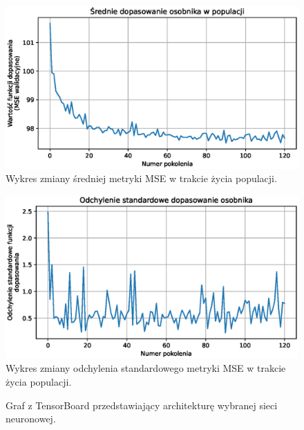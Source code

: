 \documentclass[a4paper,12pt]{article}
\numberwithin{figure}{section}
\begin{document}
    \begin{figure}[H]
        \centering
        \includegraphics[width=\textwidth]{g_a_average_fitness}
        \caption{Wykres zmiany średniej metryki MSE w trakcie życia populacji.}
        \label{fig:g_a_average_fitness}
    \end{figure}

    \smallskip

    \begin{figure}[H]
        \centering
        \includegraphics[width=\textwidth]{g_a_fitness_standard_deviation}
        \caption{Wykres zmiany odchylenia standardowego metryki MSE w trakcie życia populacji.}
        \label{fig:g_a_fitness_standard_deviation}
    \end{figure}

    \smallskip

    \begin{figure}[H]
        \centering
        \caption{Graf z TensorBoard przedstawiający architekturę wybranej sieci neuronowej.}
        \label{fig:tensorboard_graph}
    \end{figure}
\end{document}
